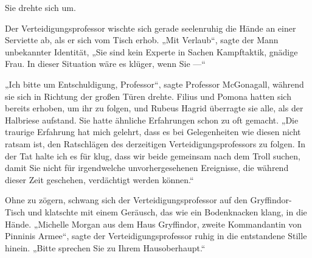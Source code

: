 Sie drehte sich um.

Der Verteidigungsprofessor wischte sich gerade seelenruhig die Hände an einer Serviette ab, als er sich vom Tisch erhob.
„Mit Verlaub“, sagte der Mann unbekannter Identität,
„Sie sind kein Experte in Sachen Kampftaktik, gnädige Frau. In dieser Situation wäre es klüger, wenn Sie —“

„Ich bitte um Entschuldigung, Professor“, sagte Professor McGonagall, während sie sich in Richtung der großen Türen drehte. Filius und Pomona hatten sich bereits erhoben, um ihr zu folgen, und Rubeus Hagrid überragte sie alle, als der Halbriese aufstand. Sie hatte ähnliche Erfahrungen schon zu oft gemacht.
„Die traurige Erfahrung hat mich gelehrt, dass es bei Gelegenheiten wie diesen nicht ratsam ist, den Ratschlägen des derzeitigen Verteidigungsprofessors zu folgen. In der Tat halte ich es für klug, dass wir beide gemeinsam nach dem Troll suchen, damit Sie nicht für irgendwelche unvorhergesehenen Ereignisse, die während dieser Zeit geschehen, verdächtigt werden können.“


Ohne zu zögern, schwang sich der Verteidigungsprofessor auf den Gryffindor-Tisch und klatschte mit einem Geräusch, das wie ein Bodenknacken klang, in die Hände.
„Michelle Morgan aus dem Haus Gryffindor, zweite Kommandantin von Pinninis Armee“, sagte der Verteidigungsprofessor ruhig in die entstandene Stille hinein.
„Bitte sprechen Sie zu Ihrem Hausoberhaupt.“

